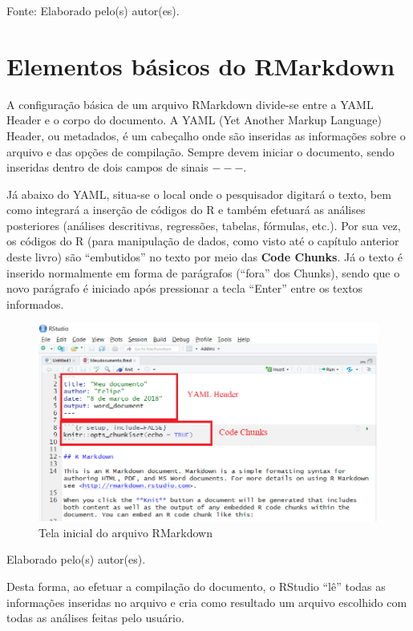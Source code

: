 \documentclass[12pt,brazil,oneside]{book}
\begin{document}
Fonte: Elaborado pelo(s) autor(es).

\hypertarget{elementos-basicos-do-rmarkdown}{%
\section{Elementos básicos do RMarkdown}\label{elementos-basicos-do-rmarkdown}}

A configuração básica de um arquivo RMarkdown divide-se entre a YAML Header e o corpo do documento. A YAML (Yet Another Markup Language) Header, ou metadados, é um cabeçalho onde são inseridas as informações sobre o arquivo e das opções de compilação. Sempre devem iniciar o documento, sendo inseridas dentro de dois campos de sinais \(---\).

Já abaixo do YAML, situa-se o local onde o pesquisador digitará o texto, bem como integrará a inserção de códigos do R e também efetuará as análises posteriores (análises descritivas, regressões, tabelas, fórmulas, etc.). Por sua vez, os códigos do R (para manipulação de dados, como visto até o capítulo anterior deste livro) são ``embutidos'' no texto por meio das \textbf{Code Chunks}. Já o texto é inserido normalmente em forma de parágrafos (``fora'' dos Chunks), sendo que o novo parágrafo é iniciado após pressionar a tecla ``Enter'' entre os textos informados.

\begin{figure}[H]

{\centering \includegraphics[width=0.8\linewidth]{rmark2} 

}

\caption{Tela inicial do arquivo RMarkdown}\label{fig:rmark2}
\end{figure}

Elaborado pelo(s) autor(es).

Desta forma, ao efetuar a compilação do documento, o RStudio ``lê'' todas as informações inseridas no arquivo e cria como resultado um arquivo escolhido com todas as análises feitas pelo usuário.
\end{document}
